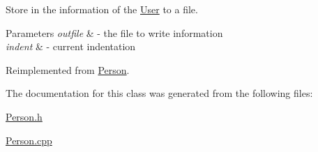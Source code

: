 Store in the information of the \mbox{\hyperlink{class_user}{User}} to a file. 


\begin{DoxyParams}{Parameters}
{\em outfile} & -\/ the file to write information \\
\hline
{\em indent} & -\/ current indentation \\
\hline
\end{DoxyParams}


Reimplemented from \mbox{\hyperlink{class_person_a80f87df3f644706c2ad8fc8b800fdd95}{Person}}.



The documentation for this class was generated from the following files\+:\begin{DoxyCompactItemize}
\item 
\mbox{\hyperlink{_person_8h}{Person.\+h}}\item 
\mbox{\hyperlink{_person_8cpp}{Person.\+cpp}}\end{DoxyCompactItemize}
